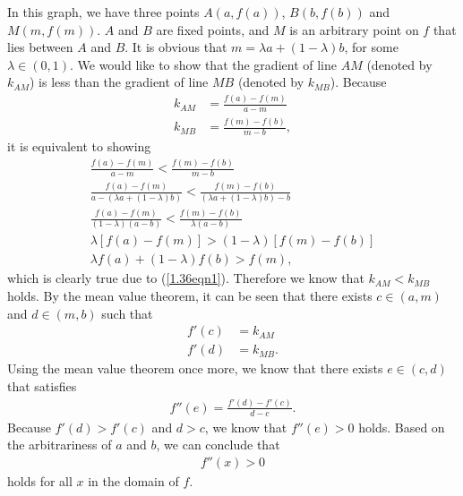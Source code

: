 \begin{answer}{}
	In this graph, we have three points $A(a, f(a))$, $B(b, f(b))$ and $M(m, f(m))$. $A$ and $B$ are fixed points, and $M$ is an arbitrary point on $f$ that lies between $A$ and $B$. It is obvious that $m = \lambda a + (1-\lambda)b$, for some $\lambda \in (0, 1)$. We would like to show that the gradient of line $AM$ (denoted by $k_{AM}$) is less than the gradient of line $MB$ (denoted by $k_{MB}$). Because
	\begin{align}
		k_{AM} &= \frac{f(a) - f(m)}{a - m}\\
		k_{MB} &= \frac{f(m) - f(b)}{m - b},
	\end{align}
	it is equivalent to showing
	\begin{gather}
		\frac{f(a) - f(m)}{a - m} <  \frac{f(m) - f(b)}{m - b}\\
		\frac{f(a) - f(m)}{a - (\lambda a + (1-\lambda)b)} <  \frac{f(m) - f(b)}{(\lambda a + (1-\lambda)b) - b}\\
		\frac{f(a) - f(m)}{(1-\lambda)(a - b)} <  \frac{f(m) - f(b)}{\lambda (a - b)}\\
		\lambda \left[ f(a) - f(m) \right] > (1-\lambda) \left[ f(m) - f(b) \right]\\
		\lambda f(a) + (1-\lambda) f(b) > f(m),
	\end{gather}
	which is clearly true due to (\ref{1.36eqn1}). Therefore we know that $k_{AM} < k_{MB}$ holds. By the mean value theorem, it can be seen that there exists $c \in (a, m)$ and $d \in (m, b)$ such that
	\begin{align}
		f'(c) &= k_{AM}\\
		f'(d) &= k_{MB}.
	\end{align}
	Using the mean value theorem once more, we know that there exists $e \in (c, d)$ that satisfies
	\begin{align}
		f''(e) = \frac{f'(d) - f'(c)}{d - c}.
	\end{align}
	Because $f'(d) > f'(c)$ and $d > c$, we know that $f''(e) > 0$ holds. Based on the arbitrariness of $a$ and $b$, we can conclude that
	\begin{align}
		f''(x) > 0
	\end{align}
	holds for all $x$ in the domain of $f$.
\end{answer}